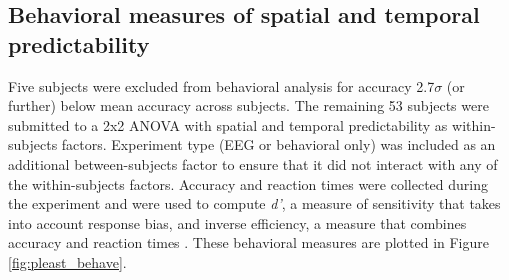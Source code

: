 \documentclass[dwyatte_dissertation.tex]{subfiles}
\begin{document}
\subsection{Behavioral measures of spatial and temporal predictability}
Five subjects were excluded from behavioral analysis for accuracy 2.7$\sigma$ (or further) below mean accuracy across subjects. The remaining 53 subjects were submitted to a 2x2 ANOVA with spatial and temporal predictability as within-subjects factors. Experiment type (EEG or behavioral only) was included as an additional between-subjects factor to ensure that it did not interact with any of the within-subjects factors. Accuracy and reaction times were collected during the experiment and were used to compute \textit{d'}, a measure of sensitivity that takes into account response bias, and inverse efficiency, a measure that combines accuracy and reaction times \cite{TownshendAshby78}. These behavioral measures are plotted in Figure \ref{fig:pleast_behave}.
\end{document}
